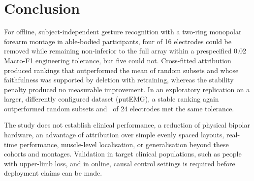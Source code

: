 \section{Conclusion}
\label{sec:conclusion}

For offline, subject-independent gesture recognition with a two-ring monopolar forearm montage in able-bodied participants, four of 16 electrodes could be removed while remaining non-inferior to the full array within a prespecified 0.02 Macro-F1 engineering tolerance, but five could not. Cross-fitted attribution produced rankings that outperformed the mean of random subsets and whose faithfulness was supported by deletion with retraining, whereas the stability penalty produced no measurable improvement. In an exploratory replication on a larger, differently configured dataset (putEMG), a stable ranking again outperformed random subsets and \PutKStarPtTwo\ of 24 electrodes met the same tolerance.

The study does not establish clinical performance, a reduction of physical bipolar hardware, an advantage of attribution over simple evenly spaced layouts, real-time performance, muscle-level localisation, or generalisation beyond these cohorts and montages. Validation in target clinical populations, such as people with upper-limb loss, and in online, causal control settings is required before deployment claims can be made.
